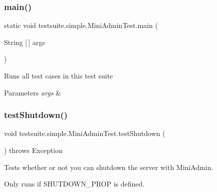 \subsubsection{\texorpdfstring{main()}{main()}}
{\footnotesize\ttfamily static void testsuite.\+simple.\+Mini\+Admin\+Test.\+main (\begin{DoxyParamCaption}\item[{String \mbox{[}$\,$\mbox{]}}]{args }\end{DoxyParamCaption})\hspace{0.3cm}{\ttfamily [static]}}

Runs all test cases in this test suite


\begin{DoxyParams}{Parameters}
{\em args} & \\
\hline
\end{DoxyParams}
\mbox{\label{classtestsuite_1_1simple_1_1_mini_admin_test_a8420a5f6bcd0ecfe1b716b8251899662}} 
\subsubsection{\texorpdfstring{test\+Shutdown()}{testShutdown()}}
{\footnotesize\ttfamily void testsuite.\+simple.\+Mini\+Admin\+Test.\+test\+Shutdown (\begin{DoxyParamCaption}{ }\end{DoxyParamCaption}) throws Exception}

Tests whether or not you can shutdown the server with Mini\+Admin.

Only runs if S\+H\+U\+T\+D\+O\+W\+N\+\_\+\+P\+R\+OP is defined.


